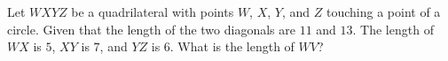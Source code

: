 Let $WXYZ$ be a quadrilateral with points $W$, $X$, $Y$, and $Z$ touching a point of a circle. Given that the length of the two diagonals are $11$ and $13$. The length of $WX$ is $5$, $XY$ is $7$, and $YZ$ is $6$. What is the length of $WV$?
